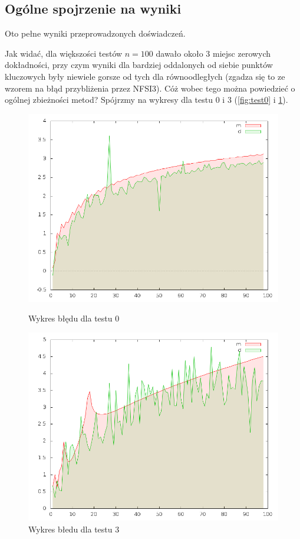 \documentclass[11pt,wide]{mwart}
\begin{document}
\subsection{Ogólne spojrzenie na wyniki}
Oto pełne wyniki przeprowadzonych doświadczeń.

Jak widać, dla większości testów $n=100$ dawało około 3 miejsc zerowych dokładności, przy czym wyniki dla bardziej oddalonych od siebie punktów kluczowych były niewiele gorsze od tych dla równoodległych (zgadza się to ze wzorem na błąd przybliżenia przez NFSI3). Cóż wobec tego można powiedzieć o ogólnej zbieżności metod? Spójrzmy na wykresy dla testu 0 i 3 (\ref{fig:test0} i \ref{fig:test3}).\\
\begin{figure}[!h]
  \begin{minipage}[b]{0.45\linewidth}
    \centering
    \includegraphics[width=\linewidth]{../wykresy/test0_diff.png}
    \caption{Wykres błędu dla testu 0}
    \label{fig:test0}
  \end{minipage}
  \hspace{0.5cm}
  \begin{minipage}[b]{0.45\linewidth}
    \centering
    \includegraphics[width=\linewidth]{../wykresy/test3_diff.png}
    \caption{Wykres błedu dla testu 3}
    \label{fig:test3}
  \end{minipage}
\end{figure}
\end{document}
